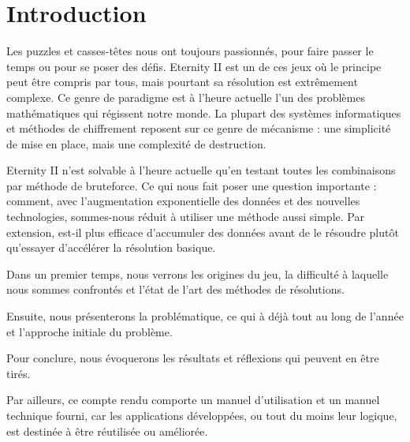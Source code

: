\documentclass{article}
\begin{document}
	\renewcommand{\labelitemi}{$\bullet$}
	\renewcommand{\labelitemii}{$\--$}
	\renewcommand{\labelitemiii}{$\diamond$}
	\renewcommand{\labelitemiv}{$\ast$}

	\newcommand{\HRule}{\rule{\linewidth}{0.5mm}}


	
	\newpage

	\thispagestyle{empty}
	\null
	\newpage
	
	\setcounter{page}{1}
	\tableofcontents
	\newpage
	
	\listoffigures
	\newpage
	

	\section{Introduction}

	Les puzzles et casses-têtes nous ont toujours passionnés, pour faire passer le temps ou pour se poser des défis. Eternity II est un de ces jeux où le principe peut être compris par tous, mais pourtant sa résolution est extrêmement complexe. Ce genre de paradigme est à l'heure actuelle l'un des problèmes mathématiques qui régissent notre monde. La plupart des systèmes informatiques et méthodes de chiffrement reposent sur ce genre de mécanisme : une simplicité de mise en place, mais une complexité de destruction.

	Eternity II n'est solvable à l'heure actuelle qu'en testant toutes les combinaisons par méthode de bruteforce. Ce qui nous fait poser une question importante : comment, avec l'augmentation exponentielle des données et des nouvelles technologies, sommes-nous réduit à utiliser une méthode aussi simple. Par extension, est-il plus efficace d'accumuler des données avant de le résoudre plutôt qu'essayer d'accélérer la résolution basique.

	Dans un premier temps, nous verrons les origines du jeu, la difficulté à laquelle nous sommes confrontés et l'état de l'art des méthodes de résolutions.
	
	Ensuite, nous présenterons la problématique, ce qui à déjà tout au long de l'année et l'approche initiale du problème.
	
	Pour conclure, nous évoquerons les résultats et réflexions qui peuvent en être tirés.
	
	Par ailleurs, ce compte rendu comporte un manuel d'utilisation et un manuel technique fourni, car les applications développées, ou tout du moins leur logique, est destinée à être réutilisée ou améliorée.
\end{document}
